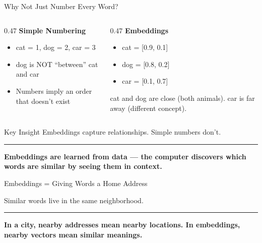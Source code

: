 \documentclass[8pt,aspectratio=169]{beamer}
\newcommand{\bottomnote}[1]{%
\vfill
\vspace{-2mm}
\textcolor{mllavender2}{\rule{\textwidth}{0.4pt}}
\vspace{1mm}
\footnotesize
\textbf{#1}
}
\newenvironment{compactlist}{%
  \begin{itemize}%
    \setlength{\itemsep}{2pt}%
    \setlength{\parskip}{0pt}%
    \setlength{\parsep}{0pt}%
}{%
  \end{itemize}%
}
\begin{document}
\begin{frame}{Why Not Just Number Every Word?}
\begin{columns}[T]
\begin{column}{0.47\textwidth}
\textcolor{mlred}{\textbf{Simple Numbering}}
\begin{compactlist}
\item cat = 1, dog = 2, car = 3
\item dog is NOT ``between'' cat and car
\item Numbers imply an order that doesn't exist
\end{compactlist}
\end{column}
\begin{column}{0.47\textwidth}
\textcolor{mlgreen}{\textbf{Embeddings}}
\begin{compactlist}
\item cat = [0.9, 0.1]
\item dog = [0.8, 0.2]
\item car = [0.1, 0.7]
\end{compactlist}
\vspace{2mm}
cat and dog are close (both animals). car is far away (different concept).
\end{column}
\end{columns}
\vspace{3mm}
\begin{block}{Key Insight}
Embeddings capture relationships. Simple numbers don't.
\end{block}
\bottomnote{Embeddings are learned from data --- the computer discovers which words are similar by seeing them in context.}
\end{frame}


\begin{frame}{Embeddings = Giving Words a Home Address}
\centering
{}

\vspace{2mm}
Similar words live in the same neighborhood.
\bottomnote{In a city, nearby addresses mean nearby locations. In embeddings, nearby vectors mean similar meanings.}
\end{frame}
\end{document}
